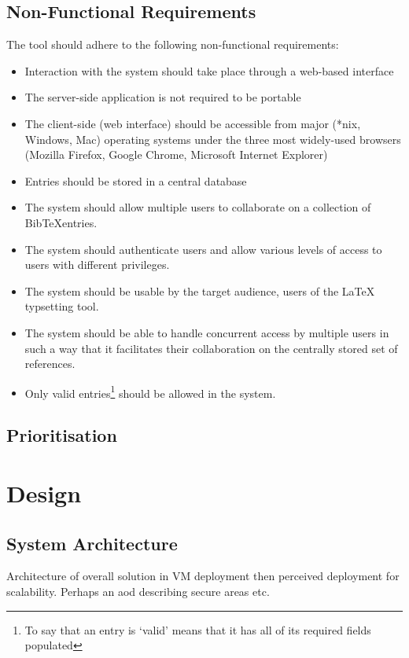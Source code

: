 \documentclass{l4proj}
\newcommand{\BibTeX}{B{\sc ib}\TeX}
\newcommand{\bibtex}{\BibTeX}
\begin{document}
\section{Non-Functional Requirements}
The tool should adhere to the following non-functional requirements:
\begin{itemize}
\item Interaction with the system should take place through a web-based interface
\item The server-side application is not required to be portable
\item The client-side (web interface) should be accessible from major (*nix, Windows, Mac) operating systems under the three most widely-used browsers (Mozilla Firefox, Google Chrome, Microsoft Internet Explorer)
\item Entries should be stored in a central database
\item The system should allow multiple users to collaborate on a collection of \bibtex entries.
\item The system should authenticate users and allow various levels of access to users with different privileges.
\item The system should be usable by the target audience, users of the LaTeX typsetting tool.
\item The system should be able to handle concurrent access by multiple users in such a way that it facilitates their collaboration on the centrally stored set of references.
\item Only valid entries\footnote{To say that an entry is `valid' means that it has all of its required fields populated} should be allowed in the system.
\end{itemize}

\section{Prioritisation}



\chapter{Design}
\label{design}

\section{System Architecture}
Architecture of overall solution in VM deployment then perceived deployment for scalability. Perhaps an \gls{aod} describing secure areas etc.
\end{document}
